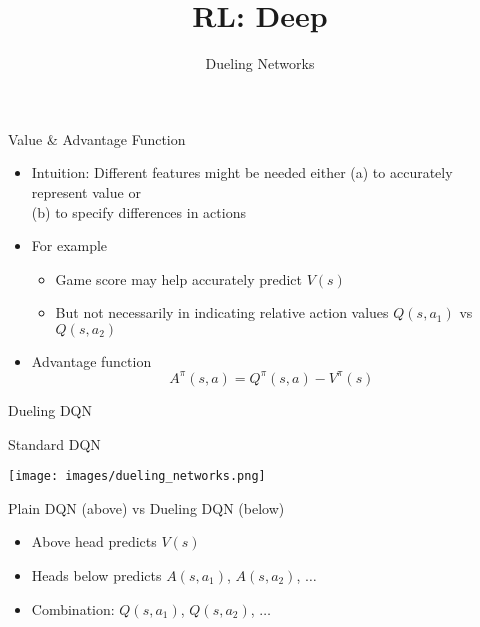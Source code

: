 \documentclass[aspectratio=169]{../latex_main/tntbeamer}  %
\title[RL: Deep Reinforcement Learning]{RL: Deep}
\subtitle{Dueling Networks}
\begin{document}
	
	\maketitle

\begin{frame}[c]{Value \& Advantage Function}
	

\begin{itemize}
	\item Intuition: Different features might be needed either (a) to accurately represent value or\\ (b) to specify differences in actions
	\item For example
	\begin{itemize}
		\item Game score may help accurately predict $V(s)$
		\item But not necessarily in indicating relative action values $Q(s,a_1)$ vs $Q(s,a_2)$
	\end{itemize}
	\item Advantage function \\
	$$A^\pi (s,a) = Q^\pi(s,a) - V^\pi(s) $$
\end{itemize}
	
\end{frame}
\begin{frame}[c]{Dueling DQN~}

\begin{center}
Standard DQN

\vspace{-2em}
\texttt{[image: images/dueling\_networks.png]}

Plain DQN (above) vs Dueling DQN (below)
\end{center}

\begin{itemize}
	\item Above head predicts $V(s)$
	\item Heads below predicts $A(s,a_1)$, $A(s,a_2)$, $\ldots$
	\item Combination: $Q(s,a_1)$, $Q(s,a_2)$, $\ldots$
\end{itemize}
	
\end{frame}
\end{document}
